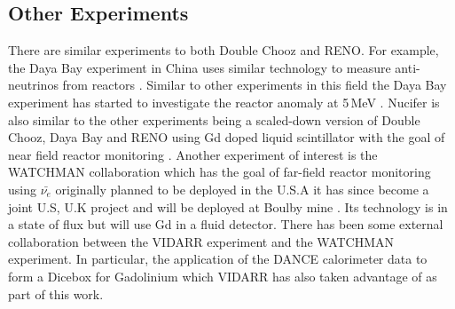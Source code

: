 \subsection{Other Experiments}
There are similar experiments to both Double Chooz and RENO. For example, the Daya Bay experiment in China uses similar technology to measure anti-neutrinos from reactors \cite{DayaBay2007Precision}. Similar to other experiments in this field the Daya Bay experiment has started to investigate the reactor anomaly at 5\,MeV \cite{Daya_Bay_2017}. Nucifer is also similar to the other experiments being a scaled-down version of Double Chooz, Daya Bay and RENO using Gd doped liquid scintillator with the goal of near field reactor monitoring \cite{nucifer2016}. Another experiment of interest is the WATCHMAN collaboration which has the goal of far-field reactor monitoring using $\bar{\nu_e}$ originally planned to be deployed in the U.S.A \cite{askins2015physics} it has since become a joint U.S, U.K project and will be deployed at Boulby mine \cite{burns2018remote}. Its technology is in a state of flux but will use Gd in a fluid detector. There has been some external collaboration between the VIDARR experiment and the WATCHMAN experiment. In particular, the application of the DANCE calorimeter data to form a Dicebox for Gadolinium which VIDARR has also taken advantage of as part of this work. 